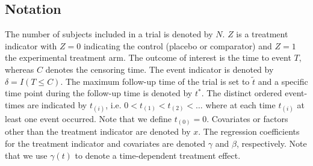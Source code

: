 \documentclass{article}
\begin{document}

\subsection{Notation} \label{notation}
\noindent The number of subjects included in a trial is denoted by $N$. $Z$ is a treatment indicator with $Z=0$ indicating the control (placebo or comparator) and $Z=1$ the experimental treatment arm. The outcome of interest is the time to event $T$, whereas $C$ denotes the censoring time. The event indicator is denoted by $\delta =I(T\le C)$. The maximum follow-up time of the trial is set to $\tilde{t}$ and a specific time point during the follow-up time is denoted by $t^*$. The distinct ordered event-times are indicated by $t_{\left(i\right)}$, i.e. $0<t_{\left(1\right)}<t_{\left(2\right)}<\dots $ where at each time $t_{\left(i\right)}$ at least one event occurred. Note that we define $t_{\left(0\right)}=0$. Covariates or factors other than the treatment indicator are denoted by $x$. The regression coefficients for the treatment indicator and covariates are denoted $\gamma$ and $\beta$, respectively. Note that we use $\gamma (t)$ to denote a time-dependent treatment effect.
\end{document}
